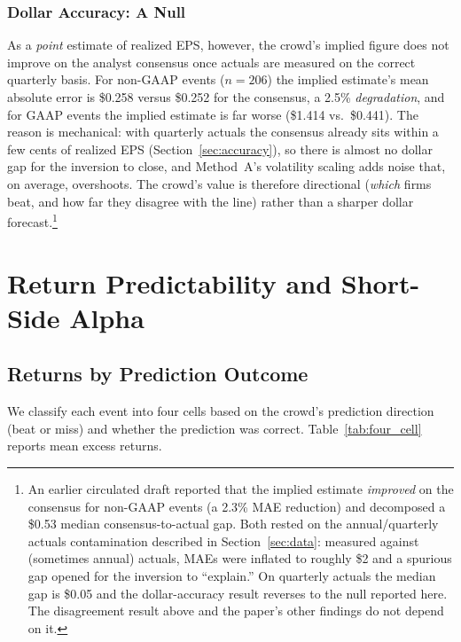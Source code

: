 \documentclass[11pt]{article}
\begin{document}
\subsubsection{Dollar Accuracy: A Null}

As a \textit{point} estimate of realized EPS, however, the crowd's implied figure does not improve on the analyst consensus once actuals are measured on the correct quarterly basis. For non-GAAP events ($n = 206$) the implied estimate's mean absolute error is \$0.258 versus \$0.252 for the consensus, a 2.5\% \textit{degradation}, and for GAAP events the implied estimate is far worse (\$1.414 vs.\ \$0.441). The reason is mechanical: with quarterly actuals the consensus already sits within a few cents of realized EPS (Section~\ref{sec:accuracy}), so there is almost no dollar gap for the inversion to close, and Method~A's volatility scaling adds noise that, on average, overshoots. The crowd's value is therefore directional (\textit{which} firms beat, and how far they disagree with the line) rather than a sharper dollar forecast.\footnote{An earlier circulated draft reported that the implied estimate \textit{improved} on the consensus for non-GAAP events (a 2.3\% MAE reduction) and decomposed a \$0.53 median consensus-to-actual gap. Both rested on the annual/quarterly actuals contamination described in Section~\ref{sec:data}: measured against (sometimes annual) actuals, MAEs were inflated to roughly \$2 and a spurious gap opened for the inversion to ``explain.'' On quarterly actuals the median gap is \$0.05 and the dollar-accuracy result reverses to the null reported here. The disagreement result above and the paper's other findings do not depend on it.}

\section{Return Predictability and Short-Side Alpha} \label{sec:returns}

\subsection{Returns by Prediction Outcome}

We classify each event into four cells based on the crowd's prediction direction (beat or miss) and whether the prediction was correct. Table~\ref{tab:four_cell} reports mean excess returns.
\end{document}
